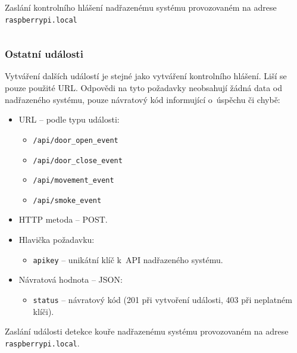 \begin{listing}[htbp]
\caption{\label{lst:api_report} Zaslání kontrolního hlášení nadřazenému systému provozovaném na adrese \texttt{raspberrypi.local}}
\inputminted[bgcolor=codebg]{python}{source-samples/api_report.py}

\end{listing}

\newpage

\subsubsection{Ostatní události}

Vytváření dalších událostí je stejné jako vytváření kontrolního hlášení. Liší se pouze použité URL. Odpovědi na tyto požadavky neobsahují žádná data od nadřazeného systému, pouze návratový kód informující o~úspěchu či chybě:

\begin{itemize}
    \item URL -- podle typu události:
    \begin{itemize}
        \item \texttt{/api/door\_open\_event}
        \item \texttt{/api/door\_close\_event}
        \item \texttt{/api/movement\_event}
        \item \texttt{/api/smoke\_event}
    \end{itemize}
    \item HTTP metoda -- POST.
    \item Hlavička požadavku:
    \begin{itemize}
        \item \texttt{apikey} -- unikátní klíč k~API nadřazeného systému.
    \end{itemize}
    \item Návratová hodnota -- JSON:
    \begin{itemize}
        \item \texttt{status} -- návratový kód (201 při vytvoření události, 403 při neplatném klíči).
    \end{itemize}
\end{itemize}

\begin{listing}[htbp]
\caption{\label{lst:api_event} Zaslání události detekce kouře nadřazenému systému provozovaném na adrese \texttt{raspberrypi.local}.}
\inputminted[bgcolor=codebg]{python}{source-samples/api_event.py}
\end{listing}

